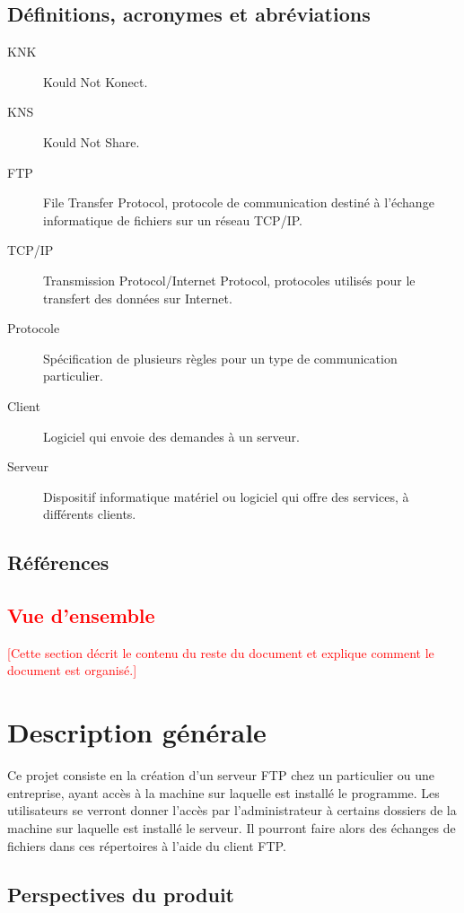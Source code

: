 \documentclass[10pt,a4paper]{report}
\begin{document}
\subsection{Définitions, acronymes et abréviations}
\begin{description}
\item[KNK] Kould Not Konect.
\item[KNS] Kould Not Share.
\item[FTP] File Transfer Protocol, protocole de communication destiné à l'échange informatique de fichiers sur un réseau TCP/IP.
\item[TCP/IP] Transmission Protocol/Internet Protocol, protocoles utilisés pour le transfert des données sur Internet.
\item[Protocole] Spécification de plusieurs règles pour un type de communication particulier.
\item[Client] Logiciel qui envoie des demandes à un serveur.
\item[Serveur] Dispositif informatique matériel ou logiciel qui offre des services, à différents clients.
\end{description}

\subsection{Références}

\textcolor{red}{\subsection{Vue d’ensemble}
[Cette section décrit le contenu du reste du document et explique comment le document est organisé.]}

\section{Description générale}

Ce projet consiste en la création d'un serveur FTP chez un particulier ou une entreprise, ayant accès à la machine sur laquelle est installé le programme. Les utilisateurs se verront donner l'accès par l'administrateur à certains dossiers de la machine sur laquelle est installé le serveur. Il pourront faire alors des échanges de fichiers dans ces répertoires à l'aide du client FTP.

\subsection{Perspectives du produit}
\end{document}
